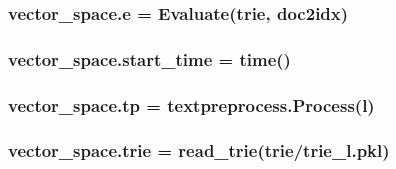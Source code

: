 \subsubsection[{\texorpdfstring{e}{e}}]{\setlength{\rightskip}{0pt plus 5cm}vector\+\_\+space.\+e = {\bf Evaluate}({\bf trie}, {\bf doc2idx})}\hypertarget{namespacevector__space_ad8aab3e65ae6d924d782f7e85f5e4e1d}{}\label{namespacevector__space_ad8aab3e65ae6d924d782f7e85f5e4e1d}
\subsubsection[{\texorpdfstring{start\+\_\+time}{start_time}}]{\setlength{\rightskip}{0pt plus 5cm}vector\+\_\+space.\+start\+\_\+time = time()}\hypertarget{namespacevector__space_acbfb0c4622de3db60780ff08b5b531e2}{}\label{namespacevector__space_acbfb0c4622de3db60780ff08b5b531e2}
\subsubsection[{\texorpdfstring{tp}{tp}}]{\setlength{\rightskip}{0pt plus 5cm}vector\+\_\+space.\+tp = {\bf textpreprocess.\+Process}(\textquotesingle{}l\textquotesingle{})}\hypertarget{namespacevector__space_a201d00bd1260755d150c26381d00f6a2}{}\label{namespacevector__space_a201d00bd1260755d150c26381d00f6a2}
\subsubsection[{\texorpdfstring{trie}{trie}}]{\setlength{\rightskip}{0pt plus 5cm}vector\+\_\+space.\+trie = read\+\_\+trie(\textquotesingle{}trie/trie\+\_\+l.\+pkl\textquotesingle{})}\hypertarget{namespacevector__space_a1571be42d00e6bcbf542bbe0ff9778b8}{}\label{namespacevector__space_a1571be42d00e6bcbf542bbe0ff9778b8}
